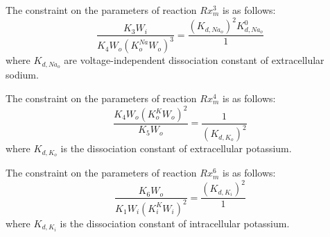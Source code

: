 The constraint on the parameters of reaction $Rx_m^3$ is as follows:
\begin{equation}
      \label{eq:constraint2}
\dfrac{K_3W_i}{K_4W_o(K_o^{Na}W_o)^3} = \dfrac{(K_{d,Na_o})^2K_{d,Na_o}^0}{1}
\end{equation}
where $K_{d,Na_o}$ are voltage-independent dissociation constant of extracellular sodium.

The constraint on the parameters of reaction $Rx_m^4$ is as follows:
\begin{equation}
      \label{eq:constraint3}
\dfrac{K_4W_o(K_o^{K}W_o)^2}{K_5W_o} = \dfrac{1}{(K_{d,K_o})^2}
\end{equation}
where $K_{d,K_o}$ is the dissociation constant of extracellular potassium.

The constraint on the parameters of reaction $Rx_m^6$ is as follows:
\begin{equation}
      \label{eq:constraint4}
\dfrac{K_6W_o}{K_1W_i(K_i^{K}W_i)^2} = \dfrac{(K_{d,K_i})^2}{1}
\end{equation}
where $K_{d,K_i}$ is the dissociation constant of intracellular potassium.

